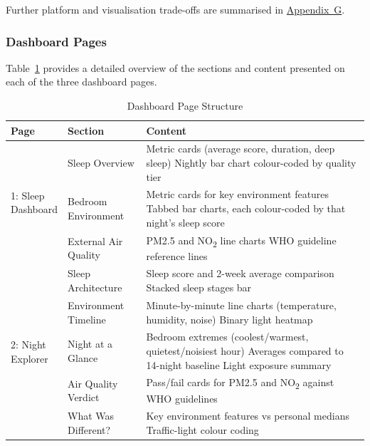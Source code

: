 \documentclass[10pt,a4paper]{extarticle}
\begin{document}
Further platform and visualisation trade-offs are summarised in \hyperref[app:G]{Appendix~G}.

\subsubsection{Dashboard Pages}

Table~\ref{tab:dashboard-pages} provides a detailed overview of the sections and content presented on each of the three dashboard pages.


\begin{table}[H]
\centering
\caption{Dashboard Page Structure}
\label{tab:dashboard-pages}
\scriptsize
\begin{tabularx}{\textwidth}{p{2.2cm} p{3.2cm} X}
\toprule
\textbf{Page} & \textbf{Section} & \textbf{Content} \\
\midrule
\multirow{3}{*}{\parbox{2.2cm}{1: Sleep\\Dashboard}} & Sleep Overview & \textbullet{} Metric cards (average score, duration, deep sleep) \textbullet{} Nightly bar chart colour-coded by quality tier \\
\cmidrule{2-3}
 & Bedroom Environment & \textbullet{} Metric cards for key environment features \textbullet{} Tabbed bar charts, each colour-coded by that night's sleep score \\
\cmidrule{2-3}
 & External Air Quality & \textbullet{} PM2.5 and NO\textsubscript{2} line charts \textbullet{} WHO guideline reference lines \\
\midrule
\multirow{5}{*}{\parbox{2.2cm}{2: Night\\Explorer}} & Sleep Architecture & \textbullet{} Sleep score and 2-week average comparison \textbullet{} Stacked sleep stages bar \\
\cmidrule{2-3}
 & Environment Timeline & \textbullet{} Minute-by-minute line charts (temperature, humidity, noise) \textbullet{} Binary light heatmap \\
\cmidrule{2-3}
 & Night at a Glance & \textbullet{} Bedroom extremes (coolest/warmest, quietest/noisiest hour) \textbullet{} Averages compared to 14-night baseline \textbullet{} Light exposure summary \\
\cmidrule{2-3}
 & Air Quality Verdict & \textbullet{} Pass/fail cards for PM2.5 and NO\textsubscript{2} against WHO guidelines \\
\cmidrule{2-3}
 & What Was Different? & \textbullet{} Key environment features vs personal medians \textbullet{} Traffic-light colour coding \\

\end{tabularx}
\end{table}
\end{document}
